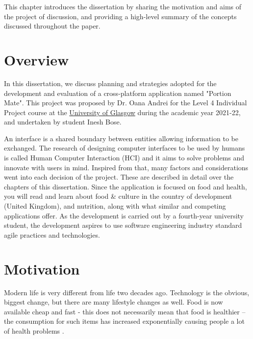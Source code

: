 \documentclass[../main.tex]{subfiles}
\begin{document}
This chapter introduces the dissertation by sharing the motivation and aims of the project of discussion, and providing a high-level summary of the concepts discussed throughout the paper.

\section{Overview}

In this dissertation, we discuss planning and strategies adopted for the development and evaluation of a cross-platform application named "Portion Mate". This project was proposed by Dr. Oana Andrei for the Level 4 Individual Project course \cite{universityofglasgowINDIVIDUALPROJECTSINGLE} at the \href{https://gla.ac.uk/}{University of Glasgow} during the academic year 2021-22, and undertaken by student Inesh Bose.

An interface is a shared boundary between entities allowing information to be exchanged. The research of designing computer interfaces to be used by humans is called Human Computer Interaction (HCI) and it aims to solve problems and innovate with users in mind. Inspired from that, many factors and considerations went into each decision of the project. These are described in detail over the chapters of this dissertation. Since the application is focused on food and health, you will read and learn about food \& culture in the country of development (United Kingdom), and nutrition, along with what similar and competing applications offer. As the development is carried out by a fourth-year university student, the development aspires to use software engineering industry standard agile practices and technologies.


\section{Motivation}

Modern life is very different from life two decades ago. Technology is the obvious, biggest change, but there are many lifestyle changes as well. Food is now available cheap and fast - this does not necessarily mean that food is healthier -- the consumption for such items has increased exponentially causing people a lot of health problems \cite{FastFoodEffects2021a,jaworowskaNutritionalChallengesHealth2013}.
\end{document}
